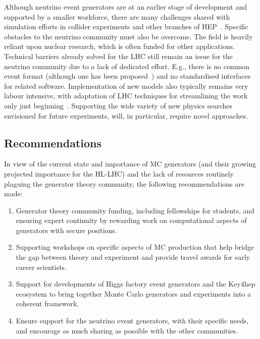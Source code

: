 \documentclass[10pt,a4paper]{article}
\begin{document}
Although neutrino event generators are at an earlier stage of development and
supported by a smaller workforce, there are many challenges shared with
simulation efforts in collider experiments and other branches of
HEP~\cite{campbell2024eg}. Specific obstacles to the neutrino community must also be
overcome. The field is heavily reliant upon nuclear research, which is often
funded for other applications. Technical barriers already solved for the LHC
still remain an issue for the neutrino community due to a lack of dedicated
effort. E.g., there is no common event format (although one has 
been proposed~\cite{gardiner2024nuhepmc}) and no standardised interfaces for related
software. Implementation of new models also typically remains very labour
intensive, with adaptation of LHC techniques for streamlining the work only just
beginning~\cite{PhysRevD.105.096006}. Supporting the
wide variety of new physics searches envisioned for future experiments, will, in
particular, require novel approaches.

\subsection{Recommendations}\label{recommendations}

In view of the current state and importance of MC generators (and their
growing projected importance for the HL-LHC) and the lack of resources
routinely plaguing the generator theory community, the following
recommendations are made:

\begin{enumerate}
\def\labelenumi{\arabic{enumi}.}
\item
  Generator theory community funding, including fellowships for students, and
  ensuring expert continuity by rewarding work on computational aspects of
  generators with secure positions.
\item
  Supporting workshops on specific aspects of MC production that help bridge the
  gap between theory and experiment and provide travel awards for early career
  scientists.
\item
  Support for developments of Higgs factory event generators and the
  Key4hep ecosystem to bring together Monte Carlo generators and
  experiments into a coherent framework.
\item
  Ensure support for the neutrino event generators, with their specific
  needs, and encourage as much sharing as possible with the other
  communities.
\end{enumerate}
\end{document}
